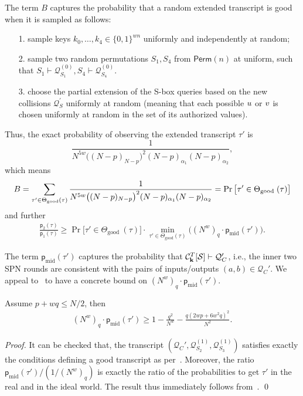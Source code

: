 The term $B$ captures the probability that a random extended transcript is good when it is sampled as follows:
%
\begin{itemize}
	\item[1.] sample keys $k_0,\ldots,k_4\in\{0,1\}^{wn}$ uniformly and independently at random;
	\item[2.] sample two random permutations $S_1,S_4$ from $\mathsf{Perm}(n)$ at uniform, such that $S_1\vdash\mathcal{Q}_{S_1}^{(0)},S_4\vdash\mathcal{Q}_{S_4}^{(0)}$.
	\item[3.] choose the partial extension of the S-box queries based on the new collisions $\mathcal{Q}_{S}^{\prime}$ uniformly at random (meaning that each possible $\mathnormal{u}$ or $\mathnormal{v}$ is chosen uniformly at random in the set of its authorized values).
\end{itemize}
%
Thus, the exact probability of observing the extended transcript $\tau'$ is
%
%
$$\frac{1}{N^{5w}\big((N-p)_{N-p}\big)^2(N-p)_{\alpha_1}(N-p)_{\alpha_2}},$$
%
%
which means
%
%
\begin{align}
B=\sum_{\tau^{\prime} \in \Theta_{\mathrm{good}}(\tau)}
	\frac{1}{N^{5w}\big((N-p)_{N-p}\big)^2(N-p)_{\alpha_1}(N-p)_{\alpha_2}}=\operatorname{Pr}\big[ \tau' \in \Theta_{\text {good }}(\tau)\big]   \notag
\end{align}
%
%
and further
%
%
\begin{align}
\frac{\mathsf{p}_{2}(\tau)}{\mathsf{p}_{1}(\tau)}   \geq  \Pr\big[ \tau' \in \Theta_{\text {good }}(\tau)\big]\cdot
  \min_{\tau' \in \Theta_{\mathrm{good}}(\tau)}\big((N^w)_q\cdot\mathsf{p}_{\mathrm{mid}}(\tau')\big). 
\label{eq:ratio-divide-4-rounds}
\end{align}
%
%


The term $\mathsf{p}_{\mathrm{mid}}(\tau')$ captures the probability that $\mathcal{C}_{\mathbf{k}}^T[\mathcal{S}] \vdash \mathcal{Q}_C'$, i.e., the inner two SPN rounds are consistent with the pairs of inputs/outputs $(a,b)\in\mathcal{Q}_C'$. We appeal to~\cite{C:CDKLST18} to have a concrete bound on $(N^w)_q\cdot\mathsf{p}_{\mathrm{mid}}(\tau')$.

\begin{lemma}
	\label{lemma:bound-middle-two-rounds}
	
	Assume $p+wq\leq N/2$, then
	\begin{align}
	(N^w)_q\cdot\mathsf{p}_{\mathrm{mid}}(\tau') \geq 1-\frac{q^2}{N^w}-\frac{q(2wp+6w^2q)^2}{N^2}.
	\label{eq:bound-on-epsilon-mid}
	\end{align}
\end{lemma}
\begin{proof}
It can be checked that, the transcript $(\mathcal{Q}_C',\mathcal{Q}_{S_2}^{(1)},\mathcal{Q}_{S_3}^{(1)})$ satisfies exactly the conditions defining a good transcript as per~\cite[page 740]{C:CDKLST18}. Moreover,
the ratio $\mathsf{p}_{\mathrm{mid}}(\tau')/(1/(N^w)_q)$ is exactly the ratio of the probabilities to get $\tau'$ in the real and in the ideal world. The result thus immediately follows from~\cite[Lemma 9]{C:CDKLST18}.       \qed
\end{proof}



